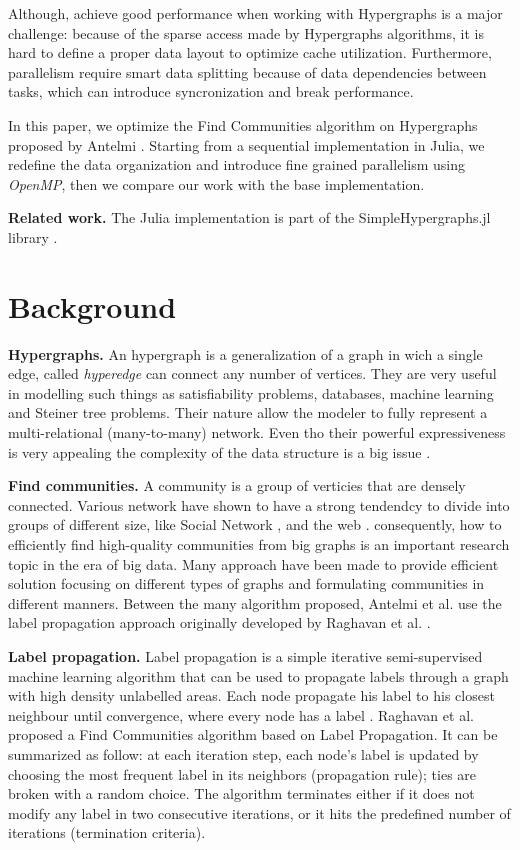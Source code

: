 \documentclass[conference]{IEEEtran}
\newcommand{\mypar}[1]{{\bf #1.}}
\begin{document}
Although, achieve good performance when working with Hypergraphs is a major challenge: because of the sparse access made by Hypergraphs algorithms, it is hard to define a proper data layout to optimize cache utilization. Furthermore, parallelism require smart data splitting because of data dependencies between tasks, which can introduce syncronization and break performance.

In this paper, we optimize the Find Communities algorithm on Hypergraphs proposed by Antelmi \cite{SimpleHypergraphs}. Starting from a sequential implementation in Julia, we redefine the data organization and introduce fine grained parallelism using \textit{OpenMP}, then we compare our work with the base implementation.

\mypar{Related work} 
The Julia implementation is part of the SimpleHypergraphs.jl library \cite{SH.jl}.

\section{Background}\label{sec:background}

\mypar{Hypergraphs}
An hypergraph is a generalization of a graph in wich a single edge, called \textit{hyperedge} can connect any number of vertices. They are very useful in modelling such things as satisfiability problems, databases, machine learning and Steiner tree problems. Their nature allow the modeler to fully represent a multi-relational (many-to-many) network.
Even tho their powerful expressiveness is very appealing the complexity of the data structure is a big issue\cite {SystemFrontiers} \cite{PhysicalReview}.

\mypar{Find communities}
A community is a group of verticies that are densely connected. Various network have shown to have a strong tendendcy to divide into groups of different size, like Social Network \cite{community_social}, and the web \cite{community_web}.
consequently, how to efficiently find high-quality  communities from big graphs is an important research topic in the era of big data. Many approach have been made to provide efficient solution focusing on different types of graphs and formulating communities in different manners.
Between the many algorithm proposed, Antelmi et al. use the label propagation approach originally developed by Raghavan et al. \cite{SimpleHypergraphs}.

\mypar{Label propagation}
Label propagation is a simple iterative semi-supervised machine learning algorithm that can be used to propagate labels through a graph with high density unlabelled areas. Each node propagate his label to his closest neighbour until convergence, where every node has a label \cite{LabelPropagation}.
Raghavan et al. proposed a Find Communities algorithm based on Label Propagation. It can be summarized as follow: at each iteration step,
each node’s label is updated by choosing the most frequent label in its neighbors (propagation rule); ties are broken with a random choice. The algorithm terminates either if it does not modify any label in two consecutive iterations, or it hits the predefined number of iterations (termination criteria). \cite{LabelPropagation}
\end{document}
